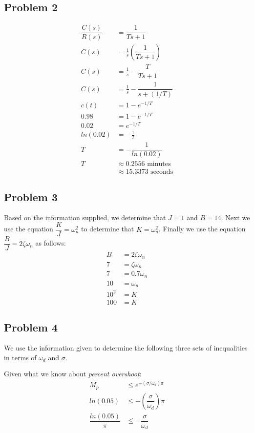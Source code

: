 \documentclass[letterpaper,10pt]{article}
\begin{document}
\subsection*{Problem 2}
\begin{align*}
	\dfrac{C(s)}{R(s)} &= \dfrac{1}{Ts+1} \\
	C(s) &= \frac{1}{s}\left(\dfrac{1}{Ts+1}\right) \\
	C(s) &= \frac{1}{s} - \dfrac{T}{Ts+1} \\
	C(s) &= \frac{1}{s} - \dfrac{1}{s+(1/T)} \\
	c(t) &= 1 - e^{-1/T} \\
	0.98 &= 1 - e^{-1/T} \\
	0.02 &= e^{-1/T} \\
	ln(0.02) &= -\frac{1}{T} \\
	T &= -\dfrac{1}{ln(0.02)} \\
	T &\approx 0.2556 \mbox{\ minutes} \\
	&\approx 15.3373 \mbox{\ seconds}
\end{align*}

\subsection*{Problem 3}
Based on the information supplied, we determine that $J = 1$ and $B = 14$.
Next we use the equation $\dfrac{K}{J} = \omega_{n}^{2}$ to determine that $K=\omega_{n}^{2}$.  Finally we use the equation $\dfrac{B}{J}=2\zeta\omega_{n}$ as follows:
\begin{align*}
	B &= 2\zeta\omega_{n} \\
	7 &= \zeta\omega_{n} \\
	7 &= 0.7\omega_{n} \\
	10 &= \omega_{n} \\
	10^2 &= K \\
	100 &= K
\end{align*}

\subsection*{Problem 4}
We use the information given to determine the following three sets of inequalities in terms of $\omega_{d}$ and $\sigma$.

Given what we know about \emph{percent overshoot}:
\begin{align*}
	M_{p} &\leq e^{-(\sigma/\omega_{d})\pi} \\
	ln(0.05) &\leq -\left(\dfrac{\sigma}{\omega_{d}}\right)\pi \\
	\dfrac{ln(0.05)}{\pi} &\leq -\dfrac{\sigma}{\omega_{d}}
\end{align*}
\end{document}
